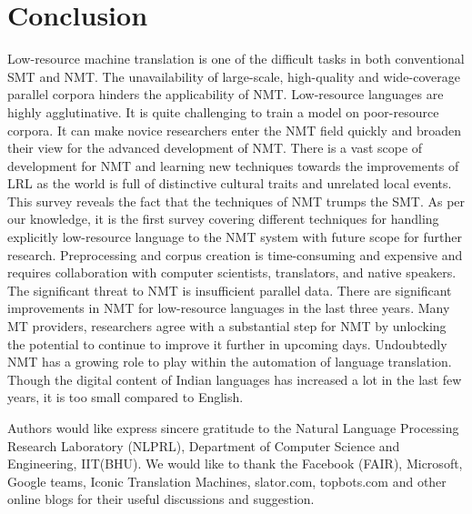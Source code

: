 \documentclass[manuscript,screen]{acmart}
\begin{document}
\section{Conclusion}
\label{conclusion}
Low-resource machine translation is one of the difficult tasks in both conventional SMT and NMT. The unavailability of large-scale, high-quality and wide-coverage parallel corpora hinders the applicability of NMT. Low-resource languages are highly agglutinative. It is quite challenging to train a model on poor-resource corpora.
It can make novice researchers enter the NMT field quickly and broaden their view for the advanced development of NMT. There is a vast scope of development for NMT and learning new techniques towards the improvements of LRL as the world is full of distinctive cultural traits and unrelated local events. This survey reveals the fact that the techniques of NMT trumps the SMT. As per our knowledge, it is the first survey covering different techniques for handling explicitly low-resource language to the NMT system with future scope for further research. Preprocessing and corpus creation is time-consuming and expensive and requires collaboration with computer scientists, translators, and native speakers. The significant threat to NMT is insufficient parallel data. There are significant improvements in NMT for low-resource languages in the last three years. Many MT providers, researchers agree with a substantial step for NMT by unlocking the potential to continue to improve it further in upcoming days. Undoubtedly NMT has a growing role to play within the automation of language translation. Though the digital content of Indian languages has increased a lot in the last few years, it is too small compared to English.
\begin{acks}
Authors would like express sincere gratitude to the Natural Language Processing Research Laboratory (NLPRL), Department of Computer Science and Engineering, IIT(BHU). We would like to thank the Facebook (FAIR), Microsoft, Google teams, Iconic Translation Machines, slator.com, topbots.com and other online blogs for their useful discussions and suggestion.
\end{acks}


\appendix
\end{document}
